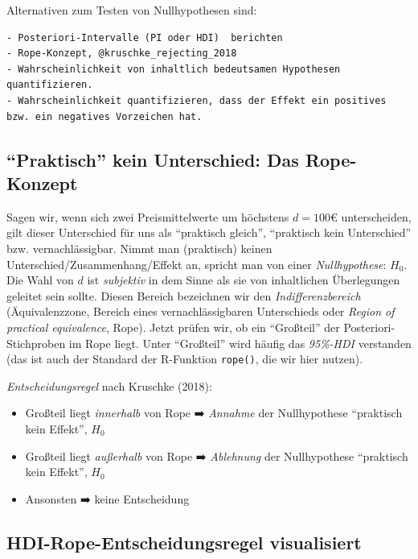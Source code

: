 \documentclass[
  a4paper,
  DIV=11]{scrreprt}
\providecommand{\tightlist}{%
  \setlength{\itemsep}{0pt}\setlength{\parskip}{0pt}}\usepackage{longtable,booktabs,array}
\theoremstyle{definition}
\theoremstyle{remark}
\begin{document}
Alternativen zum Testen von Nullhypothesen sind:

\begin{verbatim}
- Posteriori-Intervalle (PI oder HDI)  berichten
- Rope-Konzept, @kruschke_rejecting_2018
- Wahrscheinlichkeit von inhaltlich bedeutsamen Hypothesen quantifizieren.
- Wahrscheinlichkeit quantifizieren, dass der Effekt ein positives bzw. ein negatives Vorzeichen hat.
\end{verbatim}

\hypertarget{praktisch-kein-unterschied-das-rope-konzept}{%
\subsection{``Praktisch'' kein Unterschied: Das
Rope-Konzept}\label{praktisch-kein-unterschied-das-rope-konzept}}

Sagen wir, wenn sich zwei Preismittelwerte um höchstens \(d=100\)€
unterscheiden, gilt dieser Unterschied für uns als ``praktisch gleich'',
``praktisch kein Unterschied'' bzw. vernachlässigbar. Nimmt man
(praktisch) keinen Unterschied/Zusammenhang/Effekt an, spricht man von
einer \emph{Nullhypothese}: \(H_0\). Die Wahl von \(d\) ist
\emph{subjektiv} in dem Sinne als sie von inhaltlichen Überlegungen
geleitet sein sollte. Diesen Bereich bezeichnen wir den
\emph{Indifferenzbereich} (Äquivalenzzone, Bereich eines
vernachlässigbaren Unterschieds oder \emph{Region of practical
equivalence}, Rope). Jetzt prüfen wir, ob ein ``Großteil'' der
Posteriori-Stichproben im Rope liegt. Unter ``Großteil'' wird häufig das
\emph{95\%-HDI} verstanden (das ist auch der Standard der R-Funktion
\texttt{rope()}, die wir hier nutzen).

\emph{Entscheidungsregel} nach Kruschke (2018):

\begin{itemize}
\tightlist
\item
  Großteil liegt \emph{innerhalb} von Rope ➡️ \emph{Annahme} der
  Nullhypothese ``praktisch kein Effekt'', \(H_0\)
\item
  Großteil liegt \emph{außerhalb} von Rope ➡️ \emph{Ablehnung} der
  Nullhypothese ``praktisch kein Effekt'', \(H_0\)
\item
  Ansonsten ➡️ keine Entscheidung
\end{itemize}

\hypertarget{hdi-rope-entscheidungsregel-visualisiert}{%
\subsection{HDI-Rope-Entscheidungsregel
visualisiert}\label{hdi-rope-entscheidungsregel-visualisiert}}
\end{document}
